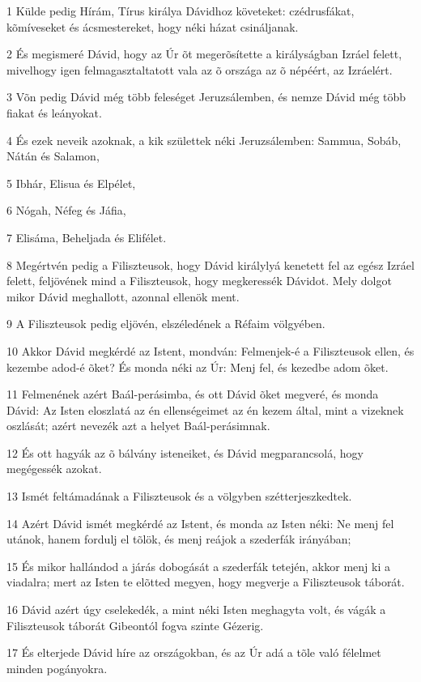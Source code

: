 \par 1 Külde pedig Hírám, Tírus királya Dávidhoz követeket: czédrusfákat, kõmíveseket és ácsmestereket, hogy néki házat csináljanak.
\par 2 És megismeré Dávid, hogy az Úr õt megerõsítette a királyságban Izráel felett, mivelhogy igen felmagasztaltatott vala az õ országa az õ népéért, az Izráelért.
\par 3 Võn pedig Dávid még több feleséget Jeruzsálemben, és nemze Dávid még több fiakat és leányokat.
\par 4 És ezek neveik azoknak, a kik születtek néki Jeruzsálemben: Sammua, Sobáb,  Nátán és Salamon,
\par 5 Ibhár, Elisua és Elpélet,
\par 6 Nógah, Néfeg és Jáfia,
\par 7 Elisáma, Beheljada és Elifélet.
\par 8 Megértvén pedig a Filiszteusok, hogy Dávid királylyá kenetett fel az egész Izráel felett, feljövének mind a Filiszteusok, hogy megkeressék Dávidot. Mely dolgot mikor Dávid meghallott, azonnal ellenök ment.
\par 9 A Filiszteusok pedig eljövén, elszéledének a Réfaim völgyében.
\par 10 Akkor Dávid megkérdé az Istent, mondván: Felmenjek-é a Filiszteusok ellen, és kezembe adod-é õket? És monda néki az Úr: Menj fel, és kezedbe adom õket.
\par 11 Felmenének azért Baál-perásimba, és ott Dávid õket megveré, és monda Dávid: Az Isten eloszlatá az én ellenségeimet az én kezem által, mint a vizeknek oszlását; azért nevezék azt a helyet Baál-perásimnak.
\par 12 És ott hagyák az õ bálvány isteneiket, és Dávid megparancsolá, hogy megégessék azokat.
\par 13 Ismét feltámadának a Filiszteusok és a völgyben szétterjeszkedtek.
\par 14 Azért Dávid ismét megkérdé az Istent, és monda az Isten néki: Ne menj fel utánok, hanem fordulj el tõlök, és menj reájok a szederfák irányában;
\par 15 És mikor hallándod a járás dobogását a szederfák tetején, akkor menj ki a viadalra; mert az Isten te elõtted megyen, hogy megverje a Filiszteusok táborát.
\par 16 Dávid azért úgy cselekedék, a mint néki Isten meghagyta volt, és vágák a Filiszteusok táborát Gibeontól fogva szinte Gézerig.
\par 17 És elterjede Dávid híre az országokban, és az Úr adá a tõle való félelmet minden pogányokra.

